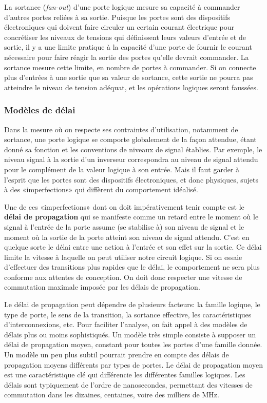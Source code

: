 \documentclass[11pt]{article}
\begin{document}
La sortance (\emph{fan-out}) d'une porte logique mesure sa capacité à commander
d'autres portes reliées à sa sortie. Puisque les portes sont des
dispositifs électroniques qui doivent faire circuler un certain
courant électrique pour concrétiser les niveaux de tensions qui
définissent leurs valeurs d'entrée et de sortie, il y a une limite
pratique à la capacité d'une porte de fournir le courant nécessaire
pour faire réagir la sortie des portes qu'elle devrait commander. La sortance 
mesure cette limite, en nombre de portes à commander. Si on
connecte plus d'entrées à une sortie que sa valeur de sortance, cette
sortie ne pourra pas atteindre le niveau de tension adéquat, et les
opérations logiques seront faussées.

\subsubsection{Modèles de délai}
\label{sec:org9bb274b}

Dans la mesure où on respecte ses contraintes d'utilisation, notamment
de sortance, une porte logique se comporte globalement de la façon
attendue, étant donné sa fonction et les conventions de niveaux de
signal établies. Par exemple, le niveau signal à la sortie d'un
inverseur correspondra au niveau de signal attendu pour le complément
de la valeur logique à son entrée. Mais il faut garder à l'esprit que
les portes sont des dispositifs électroniques, et donc physiques,
sujets à des «imperfections» qui diffèrent du comportement idéalisé.

Une de ces «imperfections» dont on doit impérativement tenir compte
est le \textbf{délai de propagation} qui se manifeste comme un retard entre
le moment où le signal à l'entrée de la porte assume (se stabilise à)
son niveau de signal et le moment où la sortie de la porte atteint
son niveau de signal attendu. C'est en quelque sorte le délai entre
une action à l'entrée et son effet sur la sortie. Ce délai limite la
vitesse à laquelle on peut utiliser notre circuit logique. Si on
essaie d'effectuer des transitions plus rapides que le délai, le
comportement ne sera plus conforme aux attentes de conception. On doit
donc respecter une vitesse de commutation maximale imposée par les
délais de propagation.

Le délai de propagation peut dépendre de plusieurs facteurs: la
famille logique, le type de porte, le sens de la transition, la
sortance effective, les caractéristiques d'interconnexions, etc. Pour
faciliter l'analyse, on fait appel à des modèles de délais plus ou
moins sophistiqués. Un modèle très simple consiste à supposer un délai
de propagation moyen, constant pour toutes les portes d'une famille
donnée. Un modèle un peu plus subtil pourrait prendre en compte des
délais de propagation moyens différents par types de portes. Le délai
de propagation moyen est une caractéristique clé qui différencie les
différentes familles logiques. Les délais sont typiquement de l'ordre
de nanosecondes, permettant des vitesses de commutation dans les
dizaines, centaines, voire des milliers de MHz.
\end{document}
